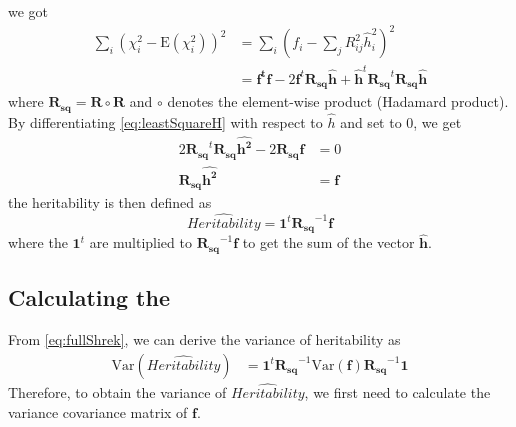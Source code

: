 			we got
			\begin{align}
			\sum_i(\chi_i^2-\mathrm{E}(\chi_i^2))^2&=\sum_i(f_i-\sum_j{R^2_{ij}\hat{h}_i^2})^2 \nonumber\\
			&=\boldsymbol{f^tf}-2\boldsymbol{f}^t\boldsymbol{R_{sq}\hat{h}}+\boldsymbol{\hat{h}}^t\boldsymbol{R_{sq}}^t\boldsymbol{R_{sq}\hat{h}}
			\label{eq:leastSquareH}
			\end{align}
			where $\boldsymbol{R_{sq}} = \boldsymbol{R}\circ\boldsymbol{R}$ and $\circ$ denotes the element-wise product (Hadamard product).
			By differentiating \cref{eq:leastSquareH} with respect to $\hat{h}$ and set to 0, we get
			\begin{align}
				2\boldsymbol{R_{sq}}^t\boldsymbol{R_{sq}}\boldsymbol{\hat{h^2}}-2\boldsymbol{R_{sq}f}&=0 \nonumber\\
				\boldsymbol{R_{sq}}\boldsymbol{\hat{h^2}} &=\boldsymbol{f}
				\label{eq:shrekEq}
			\end{align}
			the heritability is then defined as 
			\begin{equation}
			\hat{Heritability} = \boldsymbol{1}^t\boldsymbol{R_{sq}}^{-1}\boldsymbol{f}
			\label{eq:fullShrek}
			\end{equation}
			where the $\boldsymbol{1}^t$ are multiplied to $\boldsymbol{R_{sq}}^{-1}\boldsymbol{f}$ to get the sum of the vector $\hat{\boldsymbol{h}}$.
			
		\subsection{Calculating the }
			From \cref{eq:fullShrek}, we can derive the variance of heritability as 
			\begin{align}
				\mathrm{Var}(\hat{Heritability})
				&=\boldsymbol{1}^t\boldsymbol{R_{sq}}^{-1}\mathrm{Var}(\boldsymbol{f})\boldsymbol{R_{sq}}^{-1}\boldsymbol{1}
				\label{eq:varHvarf}
			\end{align}
			Therefore, to obtain the variance of $\hat{Heritability}$, we first need to calculate the variance covariance matrix of $\boldsymbol{f}$.
			
